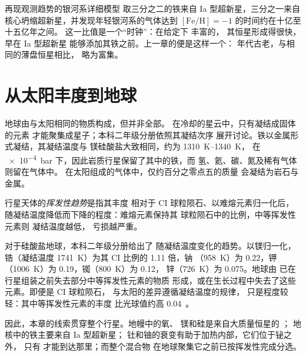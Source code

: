 再现观测趋势的银河系详细模型
取三分之二的铁来自 Ia 型超新星，三分之一来自
核心坍缩超新星，并发现年轻银河系的气体达到
$[\mathrm{Fe/H}] = -1$ 的时间约在十亿至十五亿年之间。
这一比值是一个“时钟”：在给定下 丰富的，
其恒星形成得很快，早在 Ia 型超新星
能够添加其铁之前。上一章的便是这样一个：
年代古老，与相同的薄盘恒星相比，
略为富集。

\section{从太阳丰度到地球}\label{sec:b3:origin-of-elements:earth}

地球由与太阳相同的物质构成，但并非全部。
在冷却的星云中，只有凝结成固体的元素
才能聚集成星子；本科二年级分册依照其凝结次序
展开讨论。铁以金属形式凝结，其凝结温度与
镁硅酸盐大致相同，约为 \qtyrange{1310}{1340}{K}，
在 \qty{e-4}{bar} 下，因此岩质行星保留了其中的铁，而
氢、氦、碳、氮及稀有气体则留在气体中。
在太阳组成的气体中，仅约百分之零点五的质量
会凝结为岩石与金属。

\begin{definition}[挥发性趋势]\label{def:b3:origin-of-elements:volatility}
行星天体的\emph{挥发性趋势}是指其丰度
相对于 CI 球粒陨石、以难熔元素归一化后，
随凝结温度降低而下降的程度：难熔元素保持其
球粒陨石中的比例，中等挥发性元素则
凝结温度越低，
亏损越严重。
\end{definition}

对于硅酸盐地球，本科二年级分册给出了
随凝结温度变化的趋势。以镁归一化，
锆（凝结温度 \qty{1741}{K}）为其 CI 比例的 \num{1.11} 倍，钠
（\qty{958}{K}）为 \num{0.22}，钾（\qty{1006}{K}）为
\num{0.19}，铷（\qty{800}{K}）为 \num{0.12}，
锌（\qty{726}{K}）为 \num{0.075}。地球由
已在行星组装之前失去部分中等挥发性元素的物质
形成，或在生长过程中失去了这些元素。即便是 CI 球粒陨石，
与太阳的差异遵循凝结温度的规律，
只是程度较轻：其中等挥发性元素的丰度
比光球值约高 \num{0.04}~。

因此，本章的线索贯穿整个行星。地幔中的氧、
镁和硅是来自大质量恒星的 ；
地核中的铁主要来自 Ia 型超新星；
钍和铀的衰变有助于加热内部，它们位于铋之外，
只有 才能到达那里；而整个混合物
在地球聚集它之前已按挥发性完成分选。

